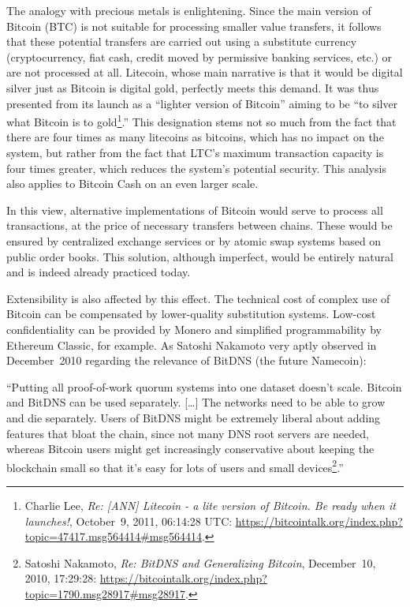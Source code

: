 \documentclass[
  a5paper,
  smalldemyvopaper,10pt,twoside,onecolumn,openright,extrafontsizes,hidelinks]{memoir}
\begin{document}
The analogy with precious metals is enlightening. Since the main version
of Bitcoin (BTC) is not suitable for processing smaller value transfers,
it follows that these potential transfers are carried out using a
substitute currency (cryptocurrency, fiat cash, credit moved by
permissive banking services, etc.) or are not processed at all.
Litecoin, whose main narrative is that it would be digital silver just
as Bitcoin is digital gold, perfectly meets this demand. It was thus
presented from its launch as a ``lighter version of Bitcoin'' aiming to
be ``to silver what Bitcoin is to gold\footnote{Charlie Lee, \emph{Re:
  {[}ANN{]} Litecoin - a lite version of Bitcoin. Be ready when it
  launches!}, October~9, 2011, 06:14:28 UTC:
  \url{https://bitcointalk.org/index.php?topic=47417.msg564414\#msg564414}.}.''
This designation stems not so much from the fact that there are four
times as many litecoins as bitcoins, which has no impact on the system,
but rather from the fact that LTC's maximum transaction capacity is four
times greater, which reduces the system's potential security. This
analysis also applies to Bitcoin Cash on an even larger scale.

In this view, alternative implementations of Bitcoin would serve to
process all transactions, at the price of necessary transfers between
chains. These would be ensured by centralized exchange services or by
atomic swap systems based on public order books. This solution, although
imperfect, would be entirely natural and is indeed already practiced
today.

Extensibility is also affected by this effect. The technical cost of
complex use of Bitcoin can be compensated by lower-quality substitution
systems. Low-cost confidentiality can be provided by Monero and
simplified programmability by Ethereum Classic, for example. As Satoshi
Nakamoto very aptly observed in December~2010 regarding the relevance of
BitDNS (the future Namecoin):

``Putting all proof-of-work quorum systems into one dataset doesn't
scale. Bitcoin and BitDNS can be used separately. {[}\ldots{]} The
networks need to be able to grow and die separately. Users of BitDNS
might be extremely liberal about adding features that bloat the chain,
since not many DNS root servers are needed, whereas Bitcoin users might
get increasingly conservative about keeping the blockchain small so that
it's easy for lots of users and small devices\footnote{Satoshi Nakamoto,
  \emph{Re: BitDNS and Generalizing Bitcoin}, December~10, 2010,
  17:29:28:
  \url{https://bitcointalk.org/index.php?topic=1790.msg28917\#msg28917}.}.''
\end{document}
